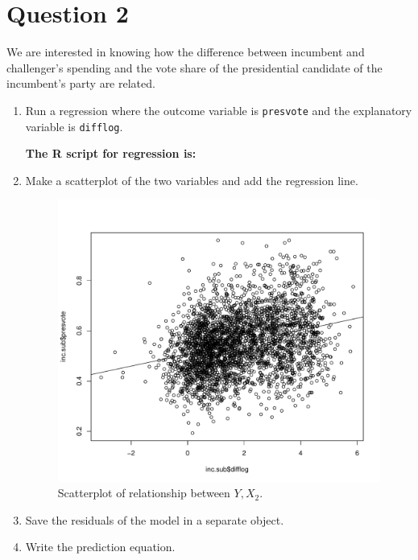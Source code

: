 \documentclass[12pt,letterpaper]{article}
\begin{document}
\newpage

\section*{Question 2}
\noindent We are interested in knowing how the difference between incumbent and challenger's spending and the vote share of the presidential candidate of the incumbent's party are related.	\vspace{.25cm}
	\begin{enumerate}
		\item Run a regression where the outcome variable is \texttt{presvote} and the explanatory variable is \texttt{difflog}.
		
		
		
		\textbf{		The R script for regression is:}
		  
		
		

		
		\item Make a scatterplot of the two variables and add the regression line. 
		
			  
		
		
		\begin{figure}[h!]\centering	\caption{\footnotesize Scatterplot of relationship between $Y, X_2$.}	
			
			\includegraphics[width=.7\textwidth]{plot2.pdf}
			
		\end{figure}
		
		
		\item Save the residuals of the model in a separate object.	\vspace{5cm}
		
		
		\item Write the prediction equation.
		
		
		
	\end{enumerate}
	
\end{document}
